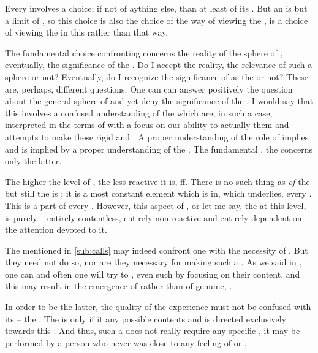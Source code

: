 \pa
Every  involves a choice; if not of aything else, than 
at least of its . But an  is but a limit of 
, so this choice is also the choice of the way of 
viewing the , is a choice of viewing the  in 
this rather than that way. 

The fundamental choice confronting 
concerns the reality of the sphere of , eventually, the
significance of the . Do I accept the reality, the 
relevance of such a sphere or not? Eventually, do I recognize the 
significance of  as the  or 
not? These are, perhaps, different questions. One can can answer 
positively the question about the general sphere of  
and yet deny the significance of the . I would say that 
this involves a confused understanding of the  
which are, in such a case, interpreted in the terms of  
with a focus on our ability to actually  them and 
attempts to make these  rigid and . A 
proper understanding of the role of  implies and is 
implied by a proper understanding of the . 
The fundamental , the  concerns 
only the latter.


\pa The higher the level of , the less reactive it is,
 ff.  There is no such thing as 
{\em of} the  but still the  is
; it is a most constant element which is 
in, which underlies, every .  This  is a
part of every .  However, this aspect of 
, or let me say, the  at 
this level, is purely  -- entirely contentless, entirely
non-reactive and entirely dependent on the attention devoted to it.

The  mentioned in \ref{sub:calls} may indeed confront
one with the necessity of \sch.  But they need not do so, nor are they
necessary for making such a .  As we said in
, one can and often one will try to
, even  such  by
focusing on their content, and this may result in the emergence of
 rather than of genuine, .

In order to be the latter, the quality of
the experience must not be confused with its  -- the
.  The  is  only if
it  any possible contents and is directed exclusively
towards this .  And thus, such a  does not
really require any specific , it may be performed by a
person who never was close to any feeling of  or
.  

